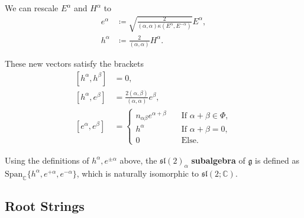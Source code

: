 \documentclass[11pt,fleqn]{article}
\begin{document}
\begin{definition}
	We can rescale $E^\alpha$ and $H^\alpha$ to
		\begin{subequations}\begin{align}
			e^\alpha &\coloneqq \sqrt{\frac{
				2
			}{
				(\alpha,\alpha) \kappa(E^\alpha,E^{-\alpha})
			}} E^\alpha, \\
			h^\alpha &\coloneqq \frac{2}{(\alpha,\alpha)}H^\alpha.\label{eq:HRescale}
		\end{align}\end{subequations}
\end{definition}
\begin{remark}
	These new vectors satisfy the brackets
		\begin{subequations}\label{eq:sl2LikeBracket} \begin{align}
			[h^\alpha, h^\beta] &= 0,\\
			[h^\alpha, e^\beta] &= \frac{2(\alpha,\beta)}{(\alpha,\alpha)} e^\beta, \\
			[e^\alpha, e^\beta] &= \begin{cases}
				n_{\alpha \beta} e^{\alpha + \beta} \quad &\text{If } \alpha + \beta \in \Phi,\\
				h^\alpha &\text{If } \alpha + \beta = 0,\\
				0 &\text{Else.}
			\end{cases}
		\end{align}\end{subequations}
\end{remark}

\begin{definition}
	Using the definitions of $h^\alpha, e^{\pm \alpha}$ above, the $\mathfrak{sl}(2)_\alpha$ \textbf{subalgebra} of $\mathfrak{g}$ is defined as $\text{Span}_\mathbb{C}\{ h^\alpha, e^{+\alpha}, e^{-\alpha}\}$, which is naturally isomorphic to $\mathfrak{sl}(2;\mathbb{C})$.
\end{definition}

\subsection{Root Strings}
\end{document}
